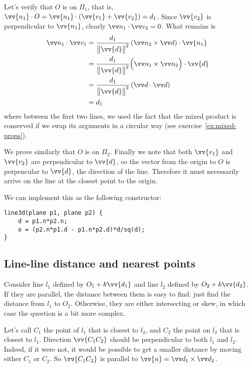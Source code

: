 
Let's verify that $O$ is on $\Pi_1$, that is, $\vv{n_1}\cdot O = \vv{n_1}\cdot(\vv{v_1} + \vv{v_2}) = d_1$. Since $\vv{v_2}$ is perpendicular to $\vv{n_1}$, clearly $\dotv{n_1}{v_2} = 0$. What remains is
\begin{align*}
\dotv{n_1}{v_1}
&= \frac{d_1}{\big\|\vv{d}\big\|^2}\left(\crossv{n_2}{d}\right)\cdot\vv{n_1} \\
&= \frac{d_1}{\big\|\vv{d}\big\|^2}\Big(\crossv{n_1}{n_2}\Big)\cdot\vv{d} \\
&= \frac{d_1}{\big\|\vv{d}\big\|^2}\left(\dotv{d}{d}\right) \\
&= d_1
\end{align*}
where between the first two lines, we used the fact that the mixed product is conserved if we swap its arguments in a circular way (see exercise~\ref{ex:mixed-props}).

We prove similarly that $O$ is on $\Pi_2$. Finally we note that both $\vv{v_1}$ and $\vv{v_2}$ are perpendicular to $\vv{d}$, so the vector from the origin to $O$ is perpencular to $\vv{d}$, the direction of the line. Therefore it must necessarily arrive on the line at the closest point to the origin.

We can implement this as the following constructor:
\begin{lstlisting}
line3d(plane p1, plane p2) {
    d = p1.n*p2.n;
    o = (p2.n*p1.d - p1.n*p2.d)*d/sq(d);
}
\end{lstlisting}

\subsection{Line-line distance and nearest points}
Consider line $l_1$ defined by $O_1 + k\vv{d_1}$ and line $l_2$ defined by $O_2 + k\vv{d_2}$.
If they are parallel, the distance between them is easy to find: just find the distance from $l_1$ to $O_2$.
Otherwise, they are either intersecting or skew, in which case the question is a bit more complex.


Let's call $C_1$ the point of $l_1$ that is closest to $l_2$, and $C_2$ the point on $l_2$ that is closest to $l_1$.
Direction $\vv{C_1C_2}$ should be perpendicular to both $l_1$ and $l_2$.
Indeed, if it were not, it would be possible to get a smaller distance by moving either $C_1$ or $C_2$.
So $\vv{C_1C_2}$ is parallel to $\vv{n}=\crossv{d_1}{d_2}$.

